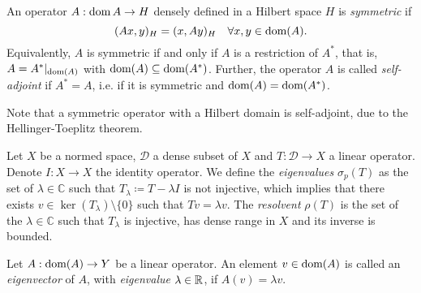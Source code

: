\begin{definition}\label{def:symmetric-selfadjoint}
    An operator $A:\operatorname{\text{dom}} A\to H$ densely defined in a Hilbert space $H$ is \emph{symmetric} if 
    \begin{equation}
        (Ax,y)_H = (x,Ay)_H \quad \forall x,y\in\operatorname{\text{dom}}(A).
    \end{equation}
    Equivalently, $A$ is symmetric if and only if $A$ is a restriction of $A^*$, that is, $A=A^*|_{\operatorname{\text{dom}}(A)}$ with $\operatorname{\text{dom}}(A)\subseteq \operatorname{\text{dom}}(A^*)$. Further, the operator $A$ is called \emph{self-adjoint} if $A^*=A$, i.e. if it is symmetric and $\operatorname{\text{dom}}(A) = \operatorname{\text{dom}}(A^*)$.  
\end{definition}
Note that a symmetric operator with a Hilbert domain is self-adjoint, due to the Hellinger-Toeplitz theorem.
\begin{definition}\label{def:eigenvalues-resolvent}
    Let $X$ be a normed space, $\mathcal{D}$ a dense subset of $X$ and $T:\mathcal{D}\to X$ a linear operator. Denote $I:X\to X$ the identity operator. We define the \emph{eigenvalues} $\sigma_p(T)$ as the set of $\lambda\in\mathbb{C}$ such that $T_\lambda  \coloneqq  T - \lambda I$ is not injective, which implies that there exists $v\in \ker(T_\lambda)\setminus \{0\}$ such that $Tv=\lambda v$. The \emph{resolvent} $\rho(T)$ is the set of the $\lambda\in\mathbb{C}$ such that $T_\lambda$ is injective, has dense range in $X$ and its inverse is bounded.
\end{definition}
\begin{definition}\label{def:eigenvalues-eigenvectors}
    Let $A:\operatorname{\text{dom}}(A)\to Y$ be a linear operator. An element $v\in \operatorname{\text{dom}}(A)$ is called an \emph{eigenvector} of $A$, with \emph{eigenvalue} $\lambda\in\mathbb{R}$, if $A(v) = \lambda v$. 
\end{definition}


